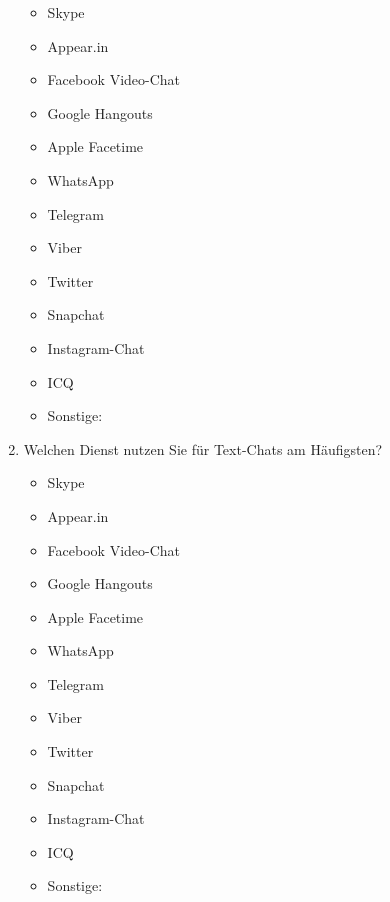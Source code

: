 \begin{enumerate}[resume]
		\begin{itemize}
		\item[\Circle] Skype
		\item[\Circle] Appear.in
        \item[\Circle] Facebook Video-Chat
        \item[\Circle] Google Hangouts
        \item[\Circle] Apple Facetime
        \item[\Circle] WhatsApp
        \item[\Circle] Telegram
        \item[\Circle] Viber
        \item[\Circle] Twitter
        \item[\Circle] Snapchat
        \item[\Circle] Instagram-Chat
        \item[\Circle] ICQ
        \item[\Circle] Sonstige:~\underline{\hspace{7.5cm}}
        \end{itemize}
        
        
\item Welchen Dienst nutzen Sie für Text-Chats am Häufigsten?

		\begin{itemize}
		\item[\Circle] Skype
		\item[\Circle] Appear.in
        \item[\Circle] Facebook Video-Chat
        \item[\Circle] Google Hangouts
        \item[\Circle] Apple Facetime
        \item[\Circle] WhatsApp
        \item[\Circle] Telegram
        \item[\Circle] Viber
        \item[\Circle] Twitter
        \item[\Circle] Snapchat
        \item[\Circle] Instagram-Chat
        \item[\Circle] ICQ
        \item[\Circle] Sonstige:~\underline{\hspace{7.5cm}}
        \end{itemize}
\end{enumerate}

